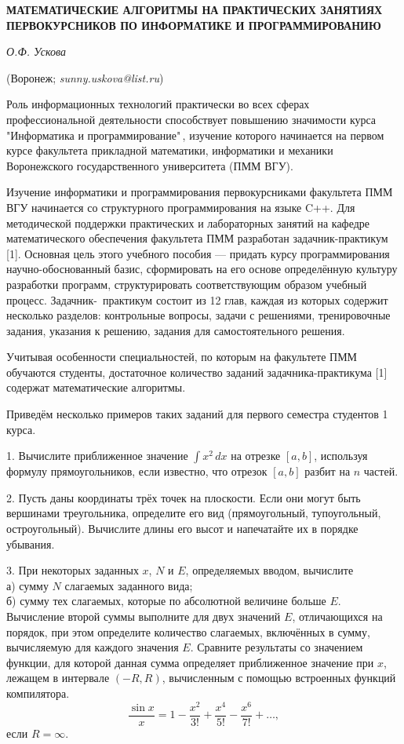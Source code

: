 
\begin{center}
    {\bf МАТЕМАТИЧЕСКИЕ АЛГОРИТМЫ НА ПРАКТИЧЕСКИХ ЗАНЯТИЯХ ПЕРВОКУРСНИКОВ ПО ИНФОРМАТИКЕ И ПРОГРАММИРОВАНИЮ}

    {\it О.Ф. Ускова}

    (Воронеж; {\it sunny.uskova@list.ru})
\end{center}


Роль информационных технологий практически во всех сферах профессиональной деятельности способствует повышению значимости
курса "Информатика и программирование"\,, изучение которого начинается на первом курсе факультета прикладной математики,
информатики и механики Воронежского государственного университета \linebreak (ПММ ВГУ).

Изучение информатики и программирования первокурсниками факультета ПММ ВГУ начинается со структурного программирования
на языке C++. Для методической поддержки практических и лабораторных занятий на кафедре математического обеспечения
факультета ПММ разработан задачник-практикум [1]. Основная цель этого учебного пособия --- придать курсу программирования
научно-обоснованный базис, сформировать на его основе определённую культуру разработки программ, структурировать
соответствующим образом учебный процесс. Задачник-~практикум состоит из 12 глав, каждая из которых содержит несколько
разделов: контрольные вопросы, задачи с решениями, тренировочные задания, указания к решению, задания для самостоятельного
решения.

Учитывая особенности специальностей, по которым на факультете ПММ обучаются студенты, достаточное количество заданий
задачника-практикума [1] содержат математические алгоритмы.

Приведём несколько примеров таких заданий для первого семестра студентов 1 курса.

1. Вычислите приближенное значение $\int x^2\,dx$ на отрезке $[a, b]$, используя формулу прямоугольников, если
известно, что отрезок $[a, b]$ разбит на $n$ частей.

2. Пусть даны координаты трёх точек на плоскости. Если они могут быть вершинами треугольника, определите его
вид (прямоугольный, тупоугольный, остроугольный). Вычислите длины его высот и напечатайте их в порядке убывания.

3. При некоторых заданных $x$, $N$ и $E$, определяемых вводом, вычислите\\
а) сумму $N$ слагаемых заданного вида;\\
б) сумму тех слагаемых, которые по абсолютной величине больше $E$. Вычисление второй суммы выполните для двух значений $E$,
отличающихся на порядок, при этом определите количество слагаемых, включённых в сумму, вычисляемую для каждого значения
$E$. Сравните результаты со значением функции, для которой данная сумма определяет приближенное значение при $x$,
лежащем в интервале $(-R, R)$, вычисленным с помощью встроенных функций компилятора.
$$
\frac{\sin x}{x}=1-\frac{x^2}{3!}+\frac{x^4}{5!}-\frac{x^6}{7!}+\dots,
$$
если $R=\infty$.

